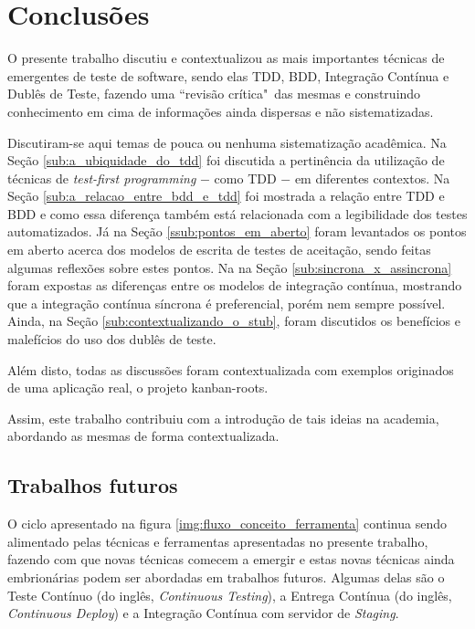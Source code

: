 \chapter{Conclusões}
\label{cha:conclusoes}

O presente trabalho discutiu e contextualizou as mais importantes técnicas de emergentes de teste de software, sendo elas TDD, BDD, Integração Contínua e Dublês de Teste, fazendo uma ``revisão crítica"\ das mesmas e construindo conhecimento em cima de informações ainda dispersas e não sistematizadas.

Discutiram-se aqui temas de pouca ou nenhuma sistematização acadêmica. Na Seção \ref{sub:a_ubiquidade_do_tdd} foi discutida a pertinência da utilização de técnicas de \textit{test-first programming} $-$ como TDD $-$ em diferentes contextos. Na Seção \ref{sub:a_relacao_entre_bdd_e_tdd} foi mostrada a relação entre TDD e BDD e como essa diferença também está relacionada com a legibilidade dos testes automatizados. Já na Seção \ref{ssub:pontos_em_aberto} foram levantados os pontos em aberto acerca dos modelos de escrita de testes de aceitação, sendo feitas algumas reflexões sobre estes pontos. Na na Seção \ref{sub:sincrona_x_assincrona} foram expostas as diferenças entre os modelos de integração contínua, mostrando que a integração contínua síncrona é preferencial, porém nem sempre possível. Ainda, na Seção \ref{sub:contextualizando_o_stub}, foram discutidos os benefícios e malefícios do uso dos dublês de teste.

Além disto, todas as discussões foram contextualizada com exemplos originados de uma aplicação real, o projeto kanban-roots.

Assim, este trabalho contribuiu com a introdução de tais ideias na academia, abordando as mesmas de forma contextualizada.

\section{Trabalhos futuros}
\label{sec:trabalhos_futuros}

O ciclo apresentado na figura \ref{img:fluxo_conceito_ferramenta} continua sendo alimentado pelas técnicas e ferramentas apresentadas no presente trabalho, fazendo com que novas técnicas comecem a emergir e estas novas técnicas ainda embrionárias podem ser abordadas em trabalhos futuros. Algumas delas são o Teste Contínuo (do inglês, \textit{Continuous Testing}), a Entrega Contínua (do inglês, \textit{Continuous Deploy}) e a Integração Contínua com servidor de \textit{Staging}.